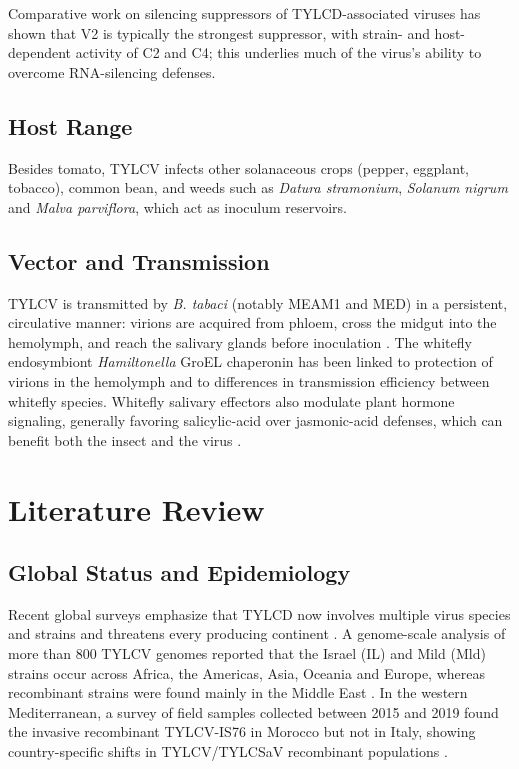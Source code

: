 \documentclass[journal]{IEEEtran}
\begin{document}
Comparative work on silencing suppressors of TYLCD-associated viruses has shown that V2 is typically the strongest suppressor, with strain- and host-dependent activity of C2 and C4; this underlies much of the virus's ability to overcome RNA-silencing defenses.

\subsection{Host Range}
Besides tomato, TYLCV infects other solanaceous crops (pepper, eggplant, tobacco), common bean, and weeds such as \textit{Datura stramonium}, \textit{Solanum nigrum} and \textit{Malva parviflora}, which act as inoculum reservoirs.

\subsection{Vector and Transmission}
TYLCV is transmitted by \textit{B. tabaci} (notably MEAM1 and MED) in a persistent, circulative manner: virions are acquired from phloem, cross the midgut into the hemolymph, and reach the salivary glands before inoculation \cite{circ2021}. The whitefly endosymbiont \textit{Hamiltonella} GroEL chaperonin has been linked to protection of virions in the hemolymph and to differences in transmission efficiency between whitefly species. Whitefly salivary effectors also modulate plant hormone signaling, generally favoring salicylic-acid over jasmonic-acid defenses, which can benefit both the insect and the virus \cite{effectors2021}.

\section{Literature Review}
\subsection{Global Status and Epidemiology}
Recent global surveys emphasize that TYLCD now involves multiple virus species and strains and threatens every producing continent \cite{yan2021}. A genome-scale analysis of more than 800 TYLCV genomes reported that the Israel (IL) and Mild (Mld) strains occur across Africa, the Americas, Asia, Oceania and Europe, whereas recombinant strains were found mainly in the Middle East \cite{marchant2023}. In the western Mediterranean, a survey of field samples collected between 2015 and 2019 found the invasive recombinant TYLCV-IS76 in Morocco but not in Italy, showing country-specific shifts in TYLCV/TYLCSaV recombinant populations \cite{med2023}.
\end{document}
